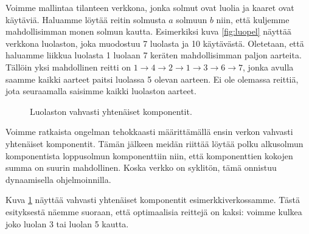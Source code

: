 Voimme mallintaa tilanteen verkkona, jonka solmut ovat luolia ja
kaaret ovat käytäviä. Haluamme löytää reitin solmusta $a$ solmuun $b$
niin, että kuljemme mahdollisimman monen solmun kautta.
Esimerkiksi kuva \ref{fig:luopel} näyttää verkkona luolaston, joka muodostuu
7 luolasta ja 10 käytävästä.
Oletetaan, että haluamme liikkua luolasta 1 luolaan 7
keräten mahdollisimman paljon aarteita.
Tällöin yksi mahdollinen reitti on
$1 \rightarrow 4 \rightarrow 2 \rightarrow 1 \rightarrow 3 \rightarrow 6 \rightarrow 7$,
jonka avulla saamme kaikki aarteet paitsi luolassa 5 olevan aarteen.
Ei ole olemassa reittiä, jota seuraamalla saisimme kaikki luolaston aarteet.

\begin{figure}
\center
\begin{center}
\end{center}
\caption{Luolaston vahvasti yhtenäiset komponentit.}
\label{fig:luovah}
\end{figure}

Voimme ratkaista ongelman tehokkaasti määrittämällä ensin verkon
vahvasti yhtenäiset komponentit.
Tämän jälkeen meidän riittää löytää polku alkusolmun komponentista
loppusolmun komponenttiin niin, että komponenttien kokojen summa
on suurin mahdollinen.
Koska verkko on syklitön, tämä onnistuu dynaamisella ohjelmoinnilla.

Kuva \ref{fig:luovah} näyttää vahvasti yhtenäiset komponentit
esimerkkiverkossamme.
Tästä esityksestä näemme suoraan, että optimaalisia reittejä on kaksi:
voimme kulkea joko luolan 3 tai luolan 5 kautta.